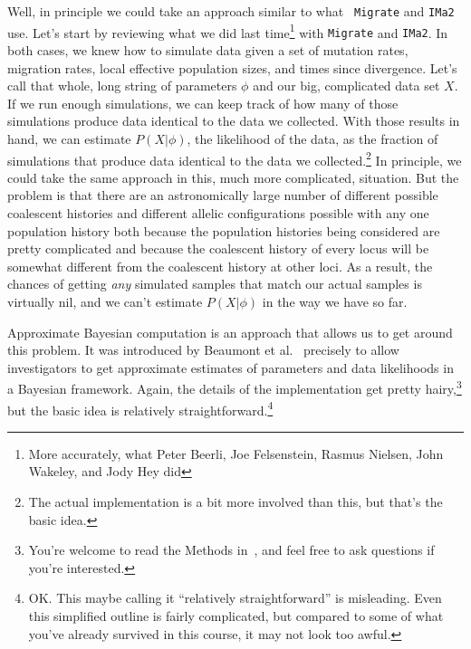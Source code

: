 \documentclass[12pt]{article}
\begin{document}
Well, in principle we could take an approach similar to what {\tt
  Migrate} and {\tt IMa2} use. Let's start by reviewing what we did
last time\footnote{More accurately, what Peter Beerli, Joe
  Felsenstein, Rasmus Nielsen, John Wakeley, and Jody Hey did} with
{\tt Migrate} and {\tt IMa2}. In both cases, we knew how to simulate
data given a set of mutation rates, migration rates, local effective
population sizes, and times since divergence. Let's call that whole,
long string of parameters $\phi$ and our big, complicated data set
$X$. If we run enough simulations, we can keep track of how many of
those simulations produce data identical to the data we
collected. With those results in hand, we can estimate $P(X|\phi)$,
the likelihood of the data, as the fraction of simulations that
produce data identical to the data we collected.\footnote{The actual
  implementation is a bit more involved than this, but that's the
  basic idea.} In principle, we could take the same approach in this,
much more complicated, situation. But the problem is that there are an
astronomically large number of different possible coalescent histories
and different allelic configurations possible with any one population
history both because the population histories being considered are
pretty complicated and because the coalescent history of every locus
will be somewhat different from the coalescent history at other
loci. As a result, the chances of getting {\it any\/} simulated
samples that match our actual samples is virtually nil, and we can't
estimate $P(X|\phi)$ in the way we have so far.

Approximate Bayesian computation is an approach that allows us to get
around this problem. It was introduced by Beaumont et
al.~\cite{Beaumont-etal-2002} precisely to allow investigators to get
approximate estimates of parameters and data likelihoods in a Bayesian
framework. Again, the details of the implementation get pretty
hairy,\footnote{You're welcome to read the Methods
  in~\cite{Beaumont-etal-2002}, and feel free to ask questions if
  you're interested.} but the basic idea is relatively
straightforward.\footnote{OK. This maybe calling it ``relatively
  straightforward'' is misleading. Even this simplified outline is
  fairly complicated, but compared to some of what you've already
  survived in this course, it may not look too awful.}
\end{document}
